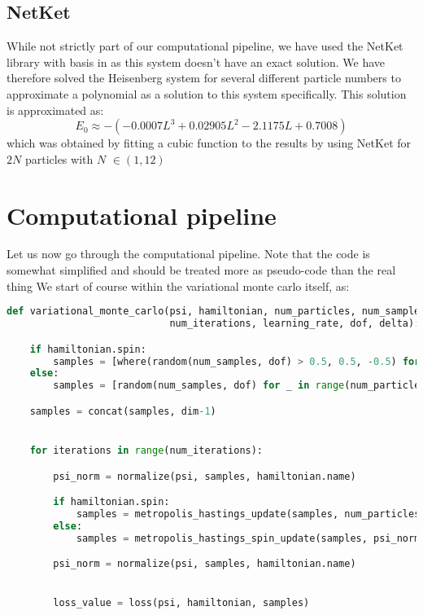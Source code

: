 \documentclass[12pt]{article}
\begin{document}
{\begin{lstlisting}[language=Python]
\end{lstlisting}
\subsection{NetKet}
While not strictly part of our computational pipeline, we have used the NetKet library with basis in \cite{nkheisenberg} as this system doesn't have an exact solution. We have therefore solved the Heisenberg system for several different particle numbers to approximate a polynomial as a solution to this system specifically. This solution is approximated as:
\begin{equation*}
    E_0 \approx -(- 0.0007 L^3 + 0.02905L^2 - 2.1175L + 0.7008)
\end{equation*}
which was obtained by fitting a cubic function to the results by using NetKet for $2N$ particles with $N$ $\in (1, 12)$
\newpage
\section{Computational pipeline}
Let us now go through the computational pipeline. Note that the code is somewhat simplified and should be treated more as pseudo-code than the real thing \newline
We start of course within the variational monte carlo itself, as:
\begin{lstlisting}[language=Python]
def variational_monte_carlo(psi, hamiltonian, num_particles, num_samples
                            num_iterations, learning_rate, dof, delta):

    if hamiltonian.spin:
        samples = [where(random(num_samples, dof) > 0.5, 0.5, -0.5) for _ in range(num_particles)]
    else:
        samples = [random(num_samples, dof) for _ in range(num_particles]

    samples = concat(samples, dim-1)


    for iterations in range(num_iterations):

        psi_norm = normalize(psi, samples, hamiltonian.name)

        if hamiltonian.spin:
            samples = metropolis_hastings_update(samples, num_particles, psi_norm, delta, hamiltonian.name)
        else:
            samples = metropolis_hastings_spin_update(samples, psi_norm)

        psi_norm = normalize(psi, samples, hamiltonian.name)


        loss_value = loss(psi, hamiltonian, samples)


\end{lstlisting}}
\end{document}
